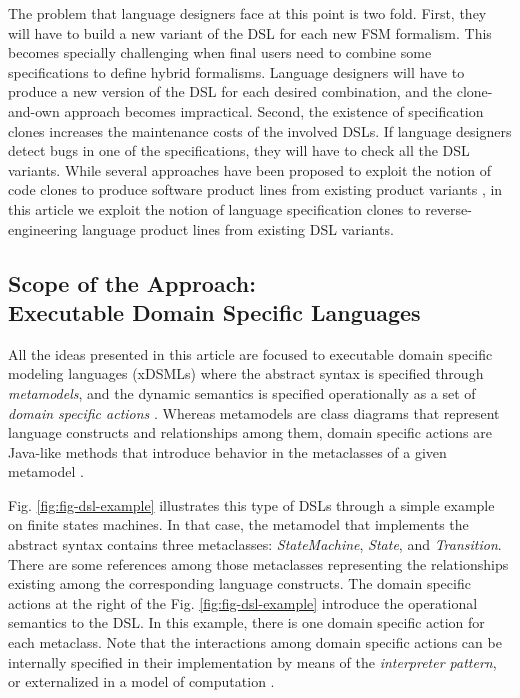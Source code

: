 The problem that language designers face at this point is two fold. First, they will have to build a new variant of the DSL for each new FSM formalism. This becomes specially challenging when final users need to combine some specifications to define hybrid formalisms. Language designers will have to produce a new version of the DSL for each desired combination, and the clone-and-own approach becomes impractical. Second, the existence of specification clones increases the maintenance costs of the involved DSLs. If language designers detect bugs in one of the specifications, they will have to check all the DSL variants. While several approaches have been proposed to exploit the notion of code clones to produce software product lines from existing product variants \cite{LopezHerrejon:2015,Martinez:2015,Martinez:2015b}, in this article we exploit the notion of language specification clones to reverse-engineering language product lines from existing DSL variants.

\subsection{Scope of the Approach: \\ \textbf{Executable Domain Specific Languages}}
\label{sec:technologicalscope}

All the ideas presented in this article are focused to executable domain specific modeling languages (xDSMLs) where the abstract syntax is specified through \textit{metamodels}, and the dynamic semantics is specified operationally as a set of \textit{domain specific actions} \cite{Combemale:2013}. Whereas metamodels are class diagrams that represent language constructs and relationships among them, domain specific actions are Java-like methods that introduce behavior in the metaclasses of a given metamodel \cite{Jezequel:2015b}. %

Fig. \ref{fig:fig-dsl-example} illustrates this type of DSLs through a simple example on finite states machines. In that case, the metamodel that implements the abstract syntax contains three metaclasses: \textsl{StateMachine}, \textsl{State}, and \textsl{Transition}. There are some references among those metaclasses representing the relationships existing among the corresponding language constructs. The domain specific actions at the right of the Fig. \ref{fig:fig-dsl-example} introduce the operational semantics to the DSL. In this example, there is one domain specific action for each metaclass. Note that the interactions among domain specific actions can be internally specified in their implementation by means of the \textit{interpreter pattern}, or externalized in a model of computation \cite{Combemale:2013}.

